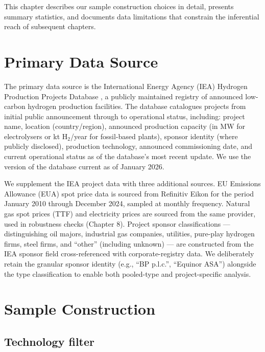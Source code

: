 \documentclass[11pt,a4paper]{article}
\begin{document}
This chapter describes our sample construction choices in detail, presents summary statistics, and documents data limitations that constrain the inferential reach of subsequent chapters.

\section{Primary Data Source}
\label{sec:ch4-source}

The primary data source is the International Energy Agency (IEA) Hydrogen Production Projects Database \citep{iea2024hydrogenprojects}, a publicly maintained registry of announced low-carbon hydrogen production facilities. The database catalogues projects from initial public announcement through to operational status, including: project name, location (country/region), announced production capacity (in MW for electrolysers or kt H$_2$/year for fossil-based plants), sponsor identity (where publicly disclosed), production technology, announced commissioning date, and current operational status as of the database's most recent update. We use the version of the database current as of January 2026.

We supplement the IEA project data with three additional sources. EU Emissions Allowance (EUA) spot price data is sourced from Refinitiv Eikon for the period January 2010 through December 2024, sampled at monthly frequency. Natural gas spot prices (TTF) and electricity prices are sourced from the same provider, used in robustness checks (Chapter 8). Project sponsor classifications --- distinguishing oil majors, industrial gas companies, utilities, pure-play hydrogen firms, steel firms, and ``other'' (including unknown) --- are constructed from the IEA sponsor field cross-referenced with corporate-registry data. We deliberately retain the granular sponsor identity (e.g., ``BP p.l.c.'', ``Equinor ASA'') alongside the type classification to enable both pooled-type and project-specific analysis.

\section{Sample Construction}
\label{sec:ch4-construction}

\subsection{Technology filter}
\end{document}
